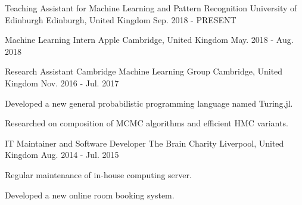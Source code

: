 

\begin{cventries}

  \cventry
    {Teaching Assistant for Machine Learning and Pattern Recognition} %
    {University of Edinburgh} %
    {Edinburgh, United Kingdom} %
    {Sep. 2018 - PRESENT} %
    {}

  \cventry
    {Machine Learning Intern} %
    {Apple} %
    {Cambridge, United Kingdom} %
    {May. 2018 - Aug. 2018} %
    {}

  \cventry
    {Research Assistant} %
    {Cambridge Machine Learning Group} %
    {Cambridge, United Kingdom} %
    {Nov. 2016 - Jul. 2017} %
    {
      \begin{cvitems} %
        \item {Developed a new general probabilistic programming language named Turing.jl.}
        \item {Researched on composition of MCMC algorithms and efficient HMC variants.}
      \end{cvitems}
    }

  \cventry
    {IT Maintainer and Software Developer} %
    {The Brain Charity} %
    {Liverpool, United Kingdom} %
    {Aug. 2014 - Jul. 2015} %
    {
      \begin{cvitems} %
        \item {Regular maintenance of in-house computing server.}
        \item {Developed a new online room booking system.}
      \end{cvitems}
    }

\end{cventries}
